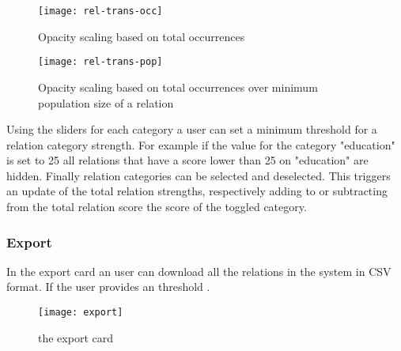 \begin{figure}[H]
    \centering
    \begin{minipage}{0.9\textwidth}
        \centering
        \texttt{[image: rel-trans-occ]}
        \caption{Opacity scaling based on total occurrences}
        \label{fig:rel-trans-occ}
    \end{minipage}\hfill
    \begin{minipage}{0.9\textwidth}
        \centering
        \texttt{[image: rel-trans-pop]}
        \caption{Opacity scaling based on total occurrences over minimum population size of a relation}
        \label{fig:rel-trans-pop}
    \end{minipage}
    \label{fig:rel-trans}
\end{figure}

Using the sliders for each category a user can set a minimum threshold for a relation category strength. For example if the value for the category "education" is set to 25 all relations that have a score lower than 25 on "education" are hidden.
Finally relation categories can be selected and deselected. This triggers an update of the total relation strengths, respectively adding to or subtracting from the total relation score the score of the toggled category.


\subsubsection{Export}
In the export card an user can download all the relations in the system in CSV format. If the user provides an threshold .

\begin{figure}[H]
    \centering
    \texttt{[image: export]}
    \caption{the export card}
    \label{fig:infoflow}
\end{figure}

